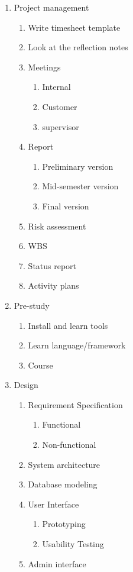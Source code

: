     \begingroup
    \fontsize{8pt}{5pt}\selectfont
\begin{mdframed}
    \begin{enumerate}
        \item Project management
        \begin{enumerate}
            \item Write timesheet template
            \item Look at the reflection notes
            \item Meetings
            \begin{enumerate}
                \item Internal
                \item Customer
                \item supervisor
            \end{enumerate}
            \item  Report
            \begin{enumerate}
                \item Preliminary version
                \item Mid-semester version
                \item Final version
            \end{enumerate}
            \item Risk assessment
            \item WBS
            \item Status report
            \item Activity plans
        \end{enumerate}

        \item Pre-study        
        \begin{enumerate}
            \item Install and learn tools
            \item Learn language/framework
            \item Course
        \end{enumerate}
        \item Design
        \begin{enumerate}
            \item Requirement Specification
            \begin{enumerate}
                \item Functional
                \item Non-functional
            \end{enumerate}
            \item  System architecture
            \item Database modeling
            \item User Interface
            \begin{enumerate}
                \item Prototyping
                \item Usability Testing
            \end{enumerate}
            \item  Admin interface
        \end{enumerate}


\end{enumerate}
\end{mdframed}
